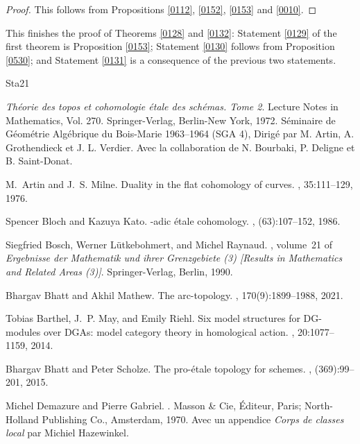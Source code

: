 \documentclass{amsart}
\theoremstyle{remark}
\numberwithin{equation}{subsection}
\begin{document}
\begin{proof}
	This follows from Propositions \ref{0112}, \ref{0152}, \ref{0153} and \ref{0010}.
\end{proof}

This finishes the proof of Theorems \ref{0128} and \ref{0132}:
Statement \eqref{0129} of the first theorem is
Proposition \ref{0153};
Statement \eqref{0130} follows from Proposition \ref{0530};
and Statement \eqref{0131} is a consequence of the previous two statements.


\begin{thebibliography}{{Sta}21}

{\em Th\'eorie des topos et cohomologie \'etale des sch\'emas. {T}ome 2}.
\newblock Lecture Notes in Mathematics, Vol. 270. Springer-Verlag, Berlin-New
  York, 1972.
\newblock S{\'e}minaire de G{\'e}om{\'e}trie Alg{\'e}brique du Bois-Marie
  1963--1964 (SGA 4), Dirig{\'e} par M. Artin, A. Grothendieck et J. L.
  Verdier. Avec la collaboration de N. Bourbaki, P. Deligne et B. Saint-Donat.

M.~Artin and J.~S. Milne.
\newblock Duality in the flat cohomology of curves.
, 35:111--129, 1976.

Spencer Bloch and Kazuya Kato.
-adic \'etale cohomology.
, (63):107--152, 1986.

Siegfried Bosch, Werner L{\"u}tkebohmert, and Michel Raynaud.
, volume~21 of {\em Ergebnisse der Mathematik und
  ihrer Grenzgebiete (3) [Results in Mathematics and Related Areas (3)]}.
\newblock Springer-Verlag, Berlin, 1990.

Bhargav Bhatt and Akhil Mathew.
\newblock The arc-topology.
, 170(9):1899--1988, 2021.

Tobias Barthel, J.~P. May, and Emily Riehl.
\newblock Six model structures for {DG}-modules over {DGA}s: model category
  theory in homological action.
, 20:1077--1159, 2014.

Bhargav Bhatt and Peter Scholze.
\newblock The pro-\'etale topology for schemes.
, (369):99--201, 2015.

Michel Demazure and Pierre Gabriel.
.
\newblock Masson \& Cie, \'Editeur, Paris; North-Holland Publishing Co.,
  Amsterdam, 1970.
\newblock Avec un appendice {\it Corps de classes local} par Michiel
  Hazewinkel.


\end{thebibliography}
\end{document}
